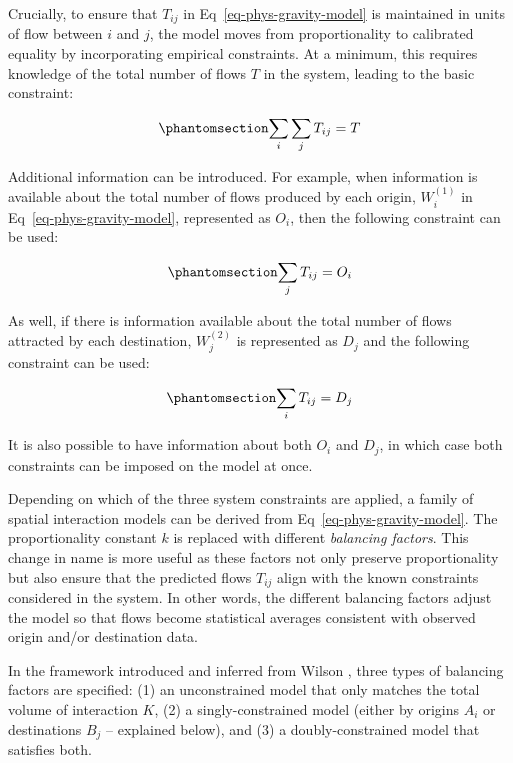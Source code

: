 \documentclass[
  10pt,
  letterpaper,
]{article}
\begin{document}
Crucially, to ensure that \(T_{ij}\) in Eq~\ref{eq-phys-gravity-model}
is maintained in units of flow between \(i\) and \(j\), the model moves
from proportionality to calibrated equality by incorporating empirical
constraints. At a minimum, this requires knowledge of the total number
of flows \(T\) in the system, leading to the basic constraint:

\begin{equation}\phantomsection\label{eq-constraint0-gravitymodel}{
\sum_i\sum_j T_{ij} = T
}\end{equation}

Additional information can be introduced. For example, when information
is available about the total number of flows produced by each origin,
\(W_i^{(1)}\) in Eq~\ref{eq-phys-gravity-model}, represented as \(O_i\),
then the following constraint can be used:

\begin{equation}\phantomsection\label{eq-constraint1-gravitymodel}{
\sum_j T_{ij} = O_i
}\end{equation}

As well, if there is information available about the total number of
flows attracted by each destination, \(W_j^{(2)}\) is represented as
\(D_j\) and the following constraint can be used:

\begin{equation}\phantomsection\label{eq-constraint2-gravitymodel}{
\sum_i T_{ij} = D_j
}\end{equation}

It is also possible to have information about both \(O_i\) and \(D_j\),
in which case both constraints can be imposed on the model at once.

Depending on which of the three system constraints are applied, a family
of spatial interaction models can be derived from
Eq~\ref{eq-phys-gravity-model}. The proportionality constant \(k\) is
replaced with different \emph{balancing factors}. This change in name is
more useful as these factors not only preserve proportionality but also
ensure that the predicted flows \(T_{ij}\) align with the known
constraints considered in the system. In other words, the different
balancing factors adjust the model so that flows become statistical
averages consistent with observed origin and/or destination data.

In the framework introduced and inferred from Wilson \citep{wilson1971},
three types of balancing factors are specified: (1) an unconstrained
model that only matches the total volume of interaction \(K\), (2) a
singly-constrained model (either by origins \(A_i\) or destinations
\(B_j\) -- explained below), and (3) a doubly-constrained model that
satisfies both.
\end{document}
